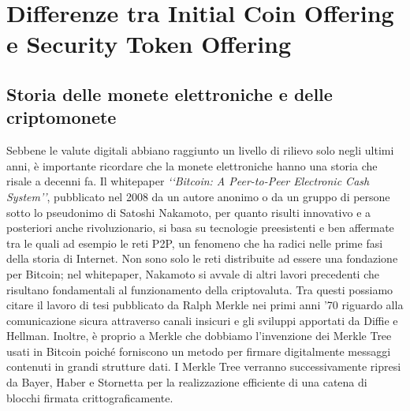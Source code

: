 \chapter{Differenze tra Initial Coin Offering e Security Token Offering}                %
\lhead[\fancyplain{}{\bfseries\thepage}]{\fancyplain{}{\bfseries\rightmark}}

\section{Storia delle monete elettroniche e delle criptomonete}

Sebbene le valute digitali abbiano raggiunto un livello di rilievo solo negli ultimi anni, è importante ricordare che la monete elettroniche hanno una storia che risale a decenni fa. Il whitepaper \textit{‘‘Bitcoin: A Peer-to-Peer Electronic Cash System’’}\cite{K1}, pubblicato nel 2008 da un autore anonimo o da un gruppo di persone sotto lo pseudonimo di Satoshi Nakamoto, per quanto risulti innovativo e a posteriori anche rivoluzionario, si basa su tecnologie preesistenti e ben affermate tra le quali ad esempio le reti P2P, un fenomeno che ha radici nelle prime fasi della storia di Internet. Non sono solo le reti distribuite ad essere una fondazione per Bitcoin; nel whitepaper, Nakamoto si avvale di altri lavori precedenti che risultano fondamentali al funzionamento della criptovaluta. Tra questi possiamo citare il lavoro di tesi pubblicato da Ralph Merkle nei primi anni ’70  riguardo alla comunicazione sicura attraverso canali insicuri e gli sviluppi apportati da Diffie e Hellman\cite{K2,K3}. Inoltre, è proprio a Merkle che dobbiamo l’invenzione dei Merkle Tree usati in Bitcoin poiché forniscono un metodo per firmare digitalmente messaggi contenuti in grandi strutture dati\cite{K4}. I Merkle Tree verranno successivamente ripresi da Bayer, Haber e Stornetta per la realizzazione efficiente di una catena di blocchi firmata crittograficamente\cite{K5}.

